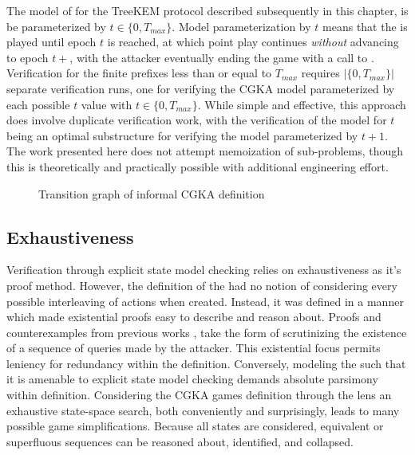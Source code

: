 The model of \CGKAdef for the TreeKEM protocol described subsequently in this chapter, is be parameterized by $t \in \{ 0, T_{max} \}$.
Model parameterization by $t$ means that the \CGKAdef is played until epoch $t$ is reached, at which point play continues \emph{without} advancing to epoch $t+$, with the attacker eventually ending the game with a call to .
Verification for the finite \CGKAsec prefixes less than or equal to \(T_{max}\) requires $|\{ 0, T_{max} \}|$ separate verification runs, one for verifying the CGKA model parameterized by each possible $t$ value with $t \in \{ 0, T_{max} \}$.
While simple and effective, this approach does involve duplicate verification work, with the verification of the model for $t$ being an optimal substructure for verifying the model parameterized by $t+1$.
The work presented here does not attempt memoization of sub-problems, though this is theoretically and practically possible with additional engineering effort.

\begin{figure}
  \centering
  \caption{\label{fig:CGKA-informal}Transition graph of informal CGKA definition}
\end{figure}



\hypertarget{exhaustiveness}{%
\subsection{Exhaustiveness}\label{exhaustiveness}}

Verification through explicit state model checking relies on exhaustiveness as it's proof method.
However, the definition of the \CGKAdef had no notion of considering every possible interleaving of actions when created.
Instead, it was defined in a manner which made existential proofs easy to describe and reason about.
Proofs and counterexamples from previous works \autocite{alwen2019double}, \autocite{alwen2020security} take the form of scrutinizing the existence of a sequence of queries made by the attacker.
This existential focus permits leniency for redundancy within the \CGKAdef definition.
Conversely, modeling the \CGKAdef such that it is amenable to explicit state model checking demands absolute parsimony within definition.
Considering the CGKA games definition through the lens an exhaustive state-space search, both conveniently and surprisingly, leads to many possible game simplifications.
Because all states are considered, equivalent or superfluous sequences can be reasoned about, identified, and collapsed.

